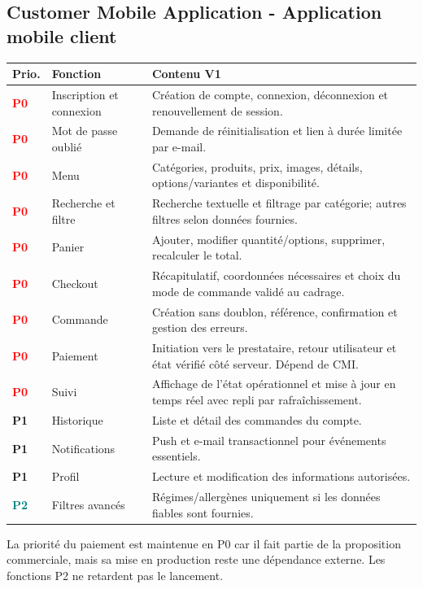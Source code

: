\documentclass[10pt,a4paper]{article}
\newcommand{\tagbox}[2]{\colorbox{#1!14}{\textcolor{#1}{\textbf{\scriptsize #2}}}}
\newcommand{\Pzero}{\tagbox{red}{P0}}
\newcommand{\Pone}{\tagbox{amber}{P1}}
\newcommand{\Ptwo}{\tagbox{teal}{P2}}
\begin{document}
\subsection{Customer Mobile Application - Application mobile client}
\begin{longtable}{@{}L{1.1cm}L{4.2cm}L{9.8cm}@{}}
\toprule
\textbf{Prio.} & \textbf{Fonction} & \textbf{Contenu V1} \\
\midrule
\endhead
\Pzero & Inscription et connexion & Création de compte, connexion, déconnexion et renouvellement de session. \\
\Pzero & Mot de passe oublié & Demande de réinitialisation et lien à durée limitée par e-mail. \\
\Pzero & Menu & Catégories, produits, prix, images, détails, options/variantes et disponibilité. \\
\Pzero & Recherche et filtre & Recherche textuelle et filtrage par catégorie; autres filtres selon données fournies. \\
\Pzero & Panier & Ajouter, modifier quantité/options, supprimer, recalculer le total. \\
\Pzero & Checkout & Récapitulatif, coordonnées nécessaires et choix du mode de commande validé au cadrage. \\
\Pzero & Commande & Création sans doublon, référence, confirmation et gestion des erreurs. \\
\Pzero & Paiement & Initiation vers le prestataire, retour utilisateur et état vérifié côté serveur. Dépend de CMI. \\
\Pzero & Suivi & Affichage de l'état opérationnel et mise à jour en temps réel avec repli par rafraîchissement. \\
\Pone & Historique & Liste et détail des commandes du compte. \\
\Pone & Notifications & Push et e-mail transactionnel pour événements essentiels. \\
\Pone & Profil & Lecture et modification des informations autorisées. \\
\Ptwo & Filtres avancés & Régimes/allergènes uniquement si les données fiables sont fournies. \\
\bottomrule
\end{longtable}
La priorité du paiement est maintenue en P0 car il fait partie de la proposition commerciale, mais sa mise en production reste une dépendance externe. Les fonctions P2 ne retardent pas le lancement.
\end{document}
